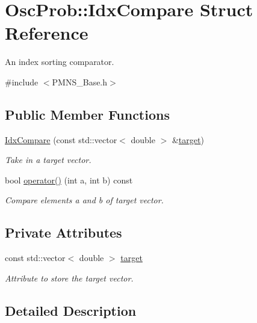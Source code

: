 \hypertarget{structOscProb_1_1IdxCompare}{}\section{Osc\+Prob\+:\+:Idx\+Compare Struct Reference}
\label{structOscProb_1_1IdxCompare}


An index sorting comparator.  




{\ttfamily \#include $<$P\+M\+N\+S\+\_\+\+Base.\+h$>$}

\subsection*{Public Member Functions}
\begin{DoxyCompactItemize}
\item 
\hyperlink{structOscProb_1_1IdxCompare_af1c43639da52d0c66e587c7432582cb5}{Idx\+Compare} (const std\+::vector$<$ double $>$ \&\hyperlink{structOscProb_1_1IdxCompare_ab3258085f0afeb64bf472413bfed43ac}{target})
\begin{DoxyCompactList}\small\item\em Take in a target vector. \end{DoxyCompactList}\item 
bool \hyperlink{structOscProb_1_1IdxCompare_aee23c0fe49fb1012222ab112e1c6817c}{operator()} (int a, int b) const 
\begin{DoxyCompactList}\small\item\em Compare elements a and b of target vector. \end{DoxyCompactList}\end{DoxyCompactItemize}
\subsection*{Private Attributes}
\begin{DoxyCompactItemize}
\item 
const std\+::vector$<$ double $>$ \hyperlink{structOscProb_1_1IdxCompare_ab3258085f0afeb64bf472413bfed43ac}{target}
\begin{DoxyCompactList}\small\item\em Attribute to store the target vector. \end{DoxyCompactList}\end{DoxyCompactItemize}


\subsection{Detailed Description}


